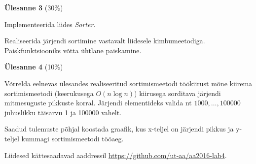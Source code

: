 \documentclass[a4paper]{article}
\begin{document}
\begin{problem}
\textbf{Ülesanne 3} (30\%)

Implementeerida liides \textit{Sorter}.

Realiseerida järjendi sortimine vastavalt liidesele kimbumeetodiga. Paiskfunktsiooniks võtta ühtlane paiskamine.
\end{problem}


\begin{problem}
\textbf{Ülesanne 4} (10\%)

Võrrelda eelnevas ülesandes realiseeritud sortimismeetodi töökiirust mõne kiirema sortimismeetodi (keerukusega
$O(n\log n)$) kiirusega sorditava järjendi mitmesuguste pikkuste korral.
Järjendi elementideks valida nt $1000, \dots , 100000$ juhuslikku täisarvu 1 ja 100000 vahelt.

\medskip
Saadud tulemuste põhjal koostada graafik, kus x-teljel on järjendi pikkus ja
y-teljel kummagi sortimismeetodi tööaeg.
\end{problem}

Liidesed kättesaadavad aaddressil \url{https://github.com/ut-aa/aa2016-lab4}.
\end{document}
